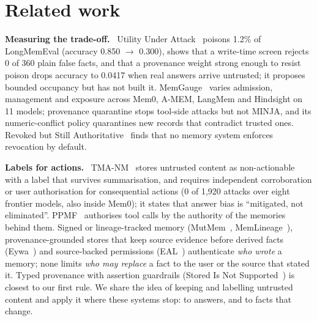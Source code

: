 \documentclass[letterpaper,twocolumn,10pt]{article}
\newcommand{\para}[1]{\smallskip\noindent\textbf{#1}\ }
\begin{document}
\section{Related work}\label{sec:related}

\para{Measuring the trade-off.} Utility Under Attack~\cite{uua} poisons 1.2\% of LongMemEval
(accuracy 0.850 $\to$ 0.300), shows that a write-time screen rejects 0 of 360 plain false
facts, and that a provenance weight strong enough to resist poison drops accuracy to 0.0417
when real answers arrive untrusted; it proposes bounded occupancy but has not built it.
MemGauge~\cite{memgauge} varies admission, management and exposure across Mem0, A-MEM, LangMem
and Hindsight on 11 models; provenance quarantine stops tool-side attacks but not MINJA, and its
numeric-conflict policy quarantines new records that contradict trusted ones. Revoked but Still
Authoritative~\cite{revoked} finds that no memory system enforces revocation by default.

\para{Labels for actions.} TMA-NM~\cite{tmanm} stores untrusted content as non-actionable with a
label that survives summarisation, and requires independent corroboration or user
authorisation for consequential actions (0 of 1,920 attacks over eight frontier models, also
inside Mem0); it states that answer bias is ``mitigated, not eliminated''. PPMF~\cite{ppmf}
authorises tool calls by the authority of the memories behind them. Signed or lineage-tracked
memory (MutMem~\cite{mutmem}, MemLineage~\cite{memlineage}), provenance-grounded stores that
keep source evidence before derived facts (Eywa~\cite{eywa}) and source-backed permissions
(EAL~\cite{eal}) authenticate \emph{who wrote} a memory; none limits \emph{who may replace} a
fact to the user or the source that stated it. Typed provenance with assertion guardrails
(Stored Is Not Supported~\cite{storednot}) is closest to our first rule. We share the idea of
keeping and labelling untrusted content and apply it where these systems stop: to answers, and
to facts that change.
\end{document}
